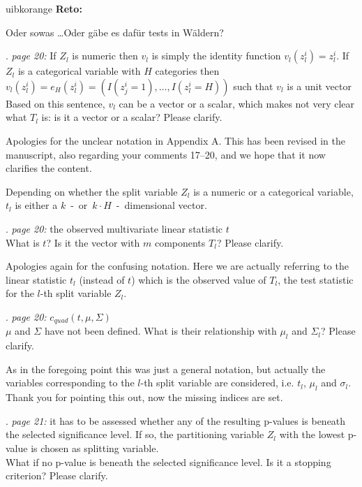 \documentclass[american,foldmarks=false,noconfig]{uibklttr}
\newenvironment{review}{\fontshape{\itdefault}\fontseries{\bfdefault} \selectfont \smallskip}{\par}
\newenvironment{reto}{
    \begin{color}{uibkorange}
    \textbf{Reto:~}
        \itshape
}{
    \end{color}
}
\begin{document}
\begin{reto}
Oder sowas \dots Oder g\"abe es daf\"ur tests in W\"aldern?
\end{reto}


\begin{review}
16. {\color{quotecolor}\textit{page 20:} If $Z_l$ is numeric 
then $v_l$ is simply the identity function $v_l(z_l^i) = z_l^i$. 
If $Z_l$ is a categorical variable with $H$ categories then 
$v_l(z_l^i) = e_H(z_l^i) = (I(z_j^i = 1), \dots , I(z_l^i = H))$ 
such that $v_l$ is a unit vector}\\
Based on this sentence, $v_l$ can be a vector or a scalar, 
which makes not very clear what $T_l$ is: is it a vector 
or a scalar? Please clarify.
\end{review}

Apologies for the unclear notation in Appendix A. This has been 
revised in the manuscript, also regarding your comments 17--20,
and we hope that it now clarifies the content.

Depending on whether the split variable $Z_l$ is a numeric 
or a categorical variable, $t_l$ is either a
$k$~-~or~$k \cdot H$~-~dimensional vector.

\begin{review}
17. {\color{quotecolor}\textit{page 20:} the observed 
multivariate linear statistic $t$}\\
What is $t$? Is it the vector with $m$ components $T_l$? 
Please clarify.
\end{review}

Apologies again for the confusing notation. Here we are 
actually referring to the linear statistic $t_l$ (instead of $t$) 
which is the observed value of $T_l$, the test statistic for 
the $l$-th split variable $Z_l$.

\begin{review}
18. {\color{quotecolor}\textit{page 20:} $c_{quad}(t, \mu, \Sigma)$}\\
$\mu$ and $\Sigma$ have not been defined. What is their relationship 
with $\mu_l$ and $\Sigma_l$? Please clarify.
\end{review}

As in the foregoing point this was just a general notation, but 
actually the variables corresponding to the $l$-th split variable 
are considered, i.e. $t_l$, $\mu_l$ and $\sigma_l$. Thank you for
pointing this out, now the missing indices are set.

\begin{review}
19. {\color{quotecolor}\textit{page 21:} it has to be assessed 
whether any of the resulting p-values is beneath the selected 
significance level. If so, the partitioning variable $Z_l$
with the lowest p-value is chosen as splitting variable.}\\
What if no p-value is beneath the selected significance level. 
Is it a stopping criterion? Please clarify.
\end{review}
\end{document}
